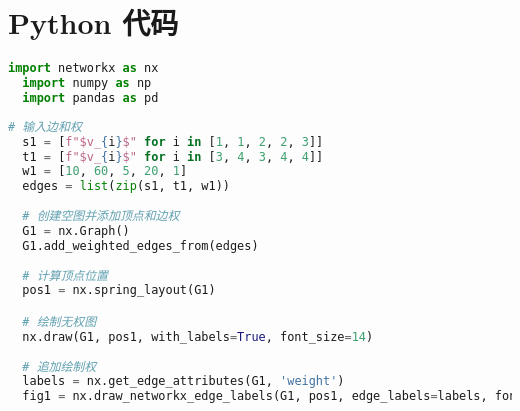 \documentclass[withoutpreface]{cumcmthesis}
\begin{document}
  \section{Python 代码}

  \begin{lstlisting}[language=python ,caption={导库} ]
  import networkx as nx
  import numpy as np
  import pandas as pd
  \end{lstlisting}

  \begin{lstlisting}[language=python ,caption={通过顶点对创建无向赋权图} ]
  # 输入边和权
  s1 = [f"$v_{i}$" for i in [1, 1, 2, 2, 3]]
  t1 = [f"$v_{i}$" for i in [3, 4, 3, 4, 4]]
  w1 = [10, 60, 5, 20, 1]
  edges = list(zip(s1, t1, w1))
  
  # 创建空图并添加顶点和边权
  G1 = nx.Graph()
  G1.add_weighted_edges_from(edges)
  
  # 计算顶点位置
  pos1 = nx.spring_layout(G1)

  # 绘制无权图
  nx.draw(G1, pos1, with_labels=True, font_size=14)
  
  # 追加绘制权
  labels = nx.get_edge_attributes(G1, 'weight')
  fig1 = nx.draw_networkx_edge_labels(G1, pos1, edge_labels=labels, font_color="red")
  \end{lstlisting}
\end{document}
